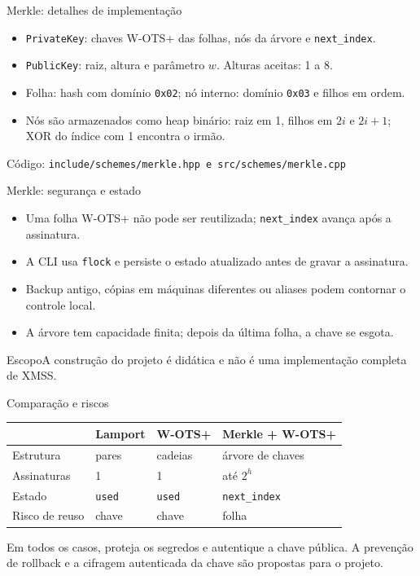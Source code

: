 \documentclass[aspectratio=169,11pt]{beamer}
\newcommand{\code}[1]{\texttt{#1}}
\newcommand{\src}[1]{\vfill{\scriptsize\color{muted} Código: \texttt{#1}}}
\begin{document}
\begin{frame}{Merkle: detalhes de implementação}
\begin{itemize}
\item \code{PrivateKey}: chaves W-OTS+ das folhas, nós da árvore e \code{next\_index}.
\item \code{PublicKey}: raiz, altura e parâmetro $w$. Alturas aceitas: 1 a 8.
\item Folha: hash com domínio \code{0x02}; nó interno: domínio \code{0x03} e filhos em ordem.
\item Nós são armazenados como heap binário: raiz em 1, filhos em $2i$ e $2i+1$; XOR do índice com 1 encontra o irmão.
\end{itemize}
\src{include/schemes/merkle.hpp \quad e \quad src/schemes/merkle.cpp}
\end{frame}

\begin{frame}{Merkle: segurança e estado}
\begin{itemize}
\item Uma folha W-OTS+ não pode ser reutilizada; \code{next\_index} avança após a assinatura.
\item A CLI usa \code{flock} e persiste o estado atualizado antes de gravar a assinatura.
\item Backup antigo, cópias em máquinas diferentes ou aliases podem contornar o controle local.
\item A árvore tem capacidade finita; depois da última folha, a chave se esgota.
\end{itemize}
\begin{block}{Escopo}A construção do projeto é didática e não é uma implementação completa de XMSS.\end{block}
\end{frame}

\begin{frame}{Comparação e riscos}
\begin{center}\renewcommand{\arraystretch}{1.4}\small
\begin{tabular}{llll}\toprule
 & Lamport & W-OTS+ & Merkle + W-OTS+ \\\midrule
Estrutura & pares & cadeias & árvore de chaves \\
Assinaturas & 1 & 1 & até $2^h$ \\
Estado & \code{used} & \code{used} & \code{next\_index} \\
Risco de reuso & chave & chave & folha \\\bottomrule
\end{tabular}\end{center}
\vspace{0.2cm}
Em todos os casos, proteja os segredos e autentique a chave pública. A prevenção de rollback e a cifragem autenticada da chave são propostas para o projeto.
\end{frame}
\end{document}

